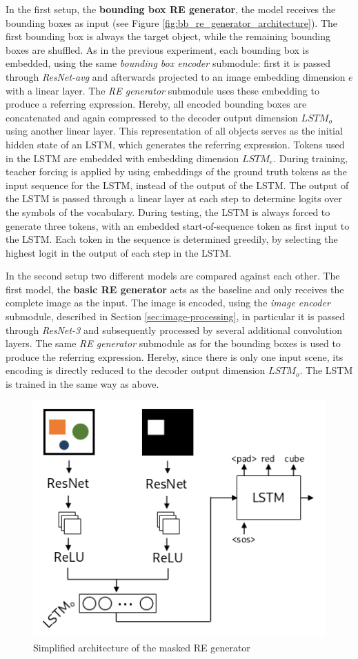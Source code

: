 In the first setup, the \textbf{bounding box RE generator}, the model receives the bounding boxes as input (see Figure \ref{fig:bb_re_generator_architecture}).
The first bounding box is always the target object, while the remaining bounding boxes are shuffled.
As in the previous experiment, each bounding box is embedded, using the same \emph{bounding box encoder} submodule: first it is passed through \emph{ResNet-avg} and afterwards projected to an image embedding dimension $e$ with a linear layer.
The \emph{RE generator} submodule uses these embedding to produce a referring expression.
Hereby, all encoded bounding boxes are concatenated and again compressed to the decoder output dimension $LSTM_o$ using another linear layer.
This representation of all objects serves as the initial hidden state of an LSTM, which generates the referring expression.
Tokens used in the LSTM are embedded with embedding dimension $LSTM_e$.
During training, teacher forcing is applied by using embeddings of the ground truth tokens as the input sequence for the LSTM, instead of the output of the LSTM.
The output of the LSTM is passed through a linear layer at each step to determine logits over the symbols of the vocabulary.
During testing, the LSTM is always forced to generate three tokens, with an embedded start-of-sequence token as first input to the LSTM.
Each token in the sequence is determined greedily, by selecting the highest logit in the output of each step in the LSTM.

In the second setup two different models are compared against each other.
The first model, the \textbf{basic RE generator} acts as the baseline and only receives the complete image as the input.
The image is encoded, using the \emph{image encoder} submodule, described in Section \ref{sec:image-processing}, in particular it is passed through \emph{ResNet-3} and subsequently processed by several additional convolution layers.
The same \emph{RE generator} submodule as for the bounding boxes is used to produce the referring expression.
Hereby, since there is only one input scene, its encoding is directly reduced to the decoder output dimension $LSTM_o$.
The LSTM is trained in the same way as above.

\begin{figure}[ht]
    \centering
    \includegraphics[width=.5\linewidth]{figures/arch_caption_generator.png}
    \caption{Simplified architecture of the masked RE generator}
    \label{fig:masked_re_generator_architecture}
\end{figure}

